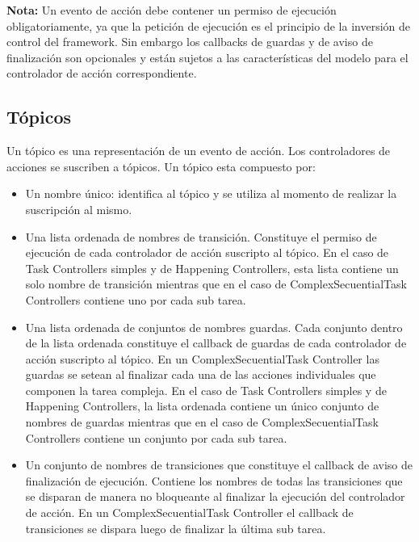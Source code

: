 \begin{framed}
\textbf{Nota:} Un evento de acción debe contener un permiso de ejecución
obligatoriamente, ya que la petición de ejecución es el principio de la
inversión de control del framework. Sin embargo los callbacks de guardas y de
aviso de finalización son opcionales y están sujetos a las características del
modelo para el controlador de acción correspondiente.
\end{framed}

\subsection{Tópicos}
\label{sec:diseno_topicos}
Un tópico es una representación de un evento de acción. Los controladores de
acciones se suscriben a tópicos.
Un tópico esta compuesto por:
\begin{itemize}
  \item Un nombre único: identifica al tópico y se utiliza al momento de
  realizar la suscripción al mismo.
  \item Una lista ordenada de nombres de transición. Constituye el permiso
  de ejecución de cada controlador de acción suscripto al tópico. En el caso de
  Task Controllers simples y de Happening Controllers, esta lista contiene
  un solo nombre de transición mientras que en el caso de ComplexSecuentialTask
  Controllers contiene uno por cada sub tarea.
  \item Una lista ordenada de conjuntos de nombres guardas. Cada conjunto
   dentro de la lista ordenada constituye el callback de guardas de cada
   controlador de acción suscripto al tópico. En un ComplexSecuentialTask
   Controller las guardas se setean al finalizar cada una de las acciones
   individuales que componen la tarea compleja. En el caso de
  Task Controllers simples y de Happening Controllers, la lista ordenada
  contiene un único conjunto de nombres de guardas mientras que en el caso de
  ComplexSecuentialTask Controllers contiene un conjunto por cada sub tarea.
  \item Un conjunto de nombres de transiciones que constituye el callback de
  aviso de finalización de ejecución. Contiene los nombres de todas las
  transiciones que se disparan de manera no bloqueante al finalizar la ejecución
  del controlador de acción. En un  ComplexSecuentialTask
  Controller el callback de transiciones se dispara luego de finalizar la última
  sub tarea.
\end{itemize}
